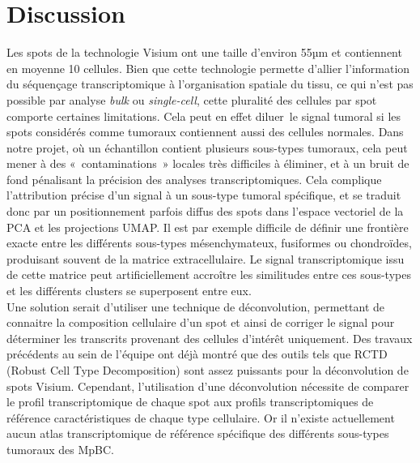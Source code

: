 \documentclass[11pt]{article}
\begin{document}

\section{Discussion}

Les spots de la technologie Visium ont une taille d’environ 55µm et contiennent en moyenne 10 cellules. Bien que cette technologie permette d’allier l’information du séquençage transcriptomique à l’organisation spatiale du tissu, ce qui n’est pas possible par analyse \textit{bulk} ou \textit{single-cell}, cette pluralité des cellules par spot comporte certaines limitations. Cela peut en effet diluer le signal tumoral si les spots considérés comme tumoraux contiennent aussi des cellules normales. Dans notre projet, où un échantillon contient plusieurs sous-types tumoraux, cela peut mener à des « contaminations » locales très difficiles à éliminer, et à un bruit de fond pénalisant la précision des analyses transcriptomiques. Cela complique l’attribution précise d’un signal à un sous-type tumoral spécifique, et se traduit donc par un positionnement parfois diffus des spots dans l’espace vectoriel de la PCA et les projections UMAP. Il est par exemple difficile de définir une frontière exacte entre les différents sous-types mésenchymateux, fusiformes ou chondroïdes, produisant souvent de la matrice extracellulaire. Le signal transcriptomique issu de cette matrice peut artificiellement accroître les similitudes entre ces sous-types et les différents clusters se superposent entre eux. \\
Une solution serait d’utiliser une technique de déconvolution, permettant de connaitre la composition cellulaire d’un spot et ainsi de corriger le signal pour déterminer les transcrits provenant des cellules d’intérêt uniquement. Des travaux précédents au sein de l’équipe ont déjà montré que des outils tels que RCTD (Robust Cell Type Decomposition) \cite{Cable2022} sont assez puissants pour la déconvolution de spots Visium. Cependant, l’utilisation d’une déconvolution nécessite de comparer le profil transcriptomique de chaque spot aux profils transcriptomiques de référence caractéristiques de chaque type cellulaire. Or il n’existe actuellement aucun atlas transcriptomique de référence spécifique des différents sous-types tumoraux des MpBC. \\
\end{document}
